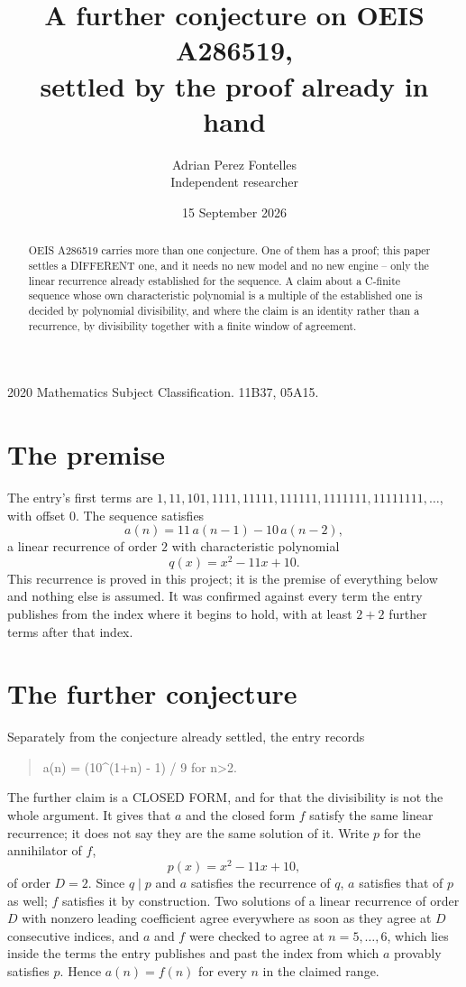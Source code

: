 \documentclass[11pt,a4paper]{article}
\title{A further conjecture on OEIS A286519,\\ \large settled by the proof already in hand}
\author{Adrian Perez Fontelles\\ \small Independent researcher}
\date{15 September 2026}
\theoremstyle{plain}
\theoremstyle{definition}
\begin{document}
\maketitle

\begin{abstract}
OEIS A286519 carries more than one conjecture. One of them has a proof; this paper settles a
DIFFERENT one, and it needs no new model and no new engine -- only the linear recurrence already
established for the sequence. A claim about a C-finite sequence whose own characteristic
polynomial is a multiple of the established one is decided by polynomial divisibility, and where
the claim is an identity rather than a recurrence, by divisibility together with a finite window
of agreement.
\end{abstract}

\noindent\small 2020 Mathematics Subject Classification. 11B37, 05A15.\normalsize

\section{The premise}

The entry's first terms are $1, 11, 101, 1111, 11111, 111111, 1111111, 11111111,\dots$, with offset $0$. The sequence satisfies
\[
  a(n)=11\,a(n-1) - 10\,a(n-2) ,
\]
a linear recurrence of order $2$ with characteristic polynomial
\[
  q(x)=x^{2} - 11 x + 10 .
\]
This recurrence is proved in this project; it is the premise of everything below and nothing else is assumed.
It was confirmed against every term the entry publishes from the index where it begins to hold,
with at least $2+2$ further terms after that index.

\section{The further conjecture}

Separately from the conjecture already settled, the entry records

\begin{quote}\raggedright a(n) = (10\^{}(1+n) - 1) / 9 for n>2.\end{quote}

The further claim is a CLOSED FORM, and for that the divisibility is not the whole argument. It
gives that $a$ and the closed form $f$ satisfy the same linear recurrence; it does not say they
are the same solution of it. Write $p$ for the annihilator of $f$,
\[
  p(x)=x^{2} - 11 x + 10 ,
\]
of order $D=2$. Since $q\mid p$ and $a$ satisfies the recurrence of $q$, $a$ satisfies that of
$p$ as well; $f$ satisfies it by construction. Two solutions of a linear recurrence of order $D$
with nonzero leading coefficient agree everywhere as soon as they agree at $D$ consecutive
indices, and $a$ and $f$ were checked to agree at $n=5,\dots,6$,
which lies inside the terms the entry publishes and past the index from which $a$ provably
satisfies $p$. Hence $a(n)=f(n)$ for every $n$ in the claimed range.
\end{document}
